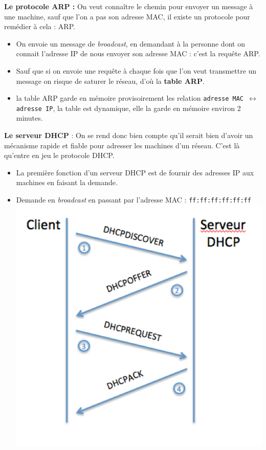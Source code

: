 \documentclass[a4paper,9pt, twocolumn]{article}
\begin{document}
	\textbf{Le protocole ARP :} On veut connaître le chemin pour envoyer un message à une machine, sauf que l'on a pas son adresse MAC, il existe un protocole pour remédier à cela : ARP.
	\begin{itemize}
		\item On envoie un message de \emph{broadcast}, en demandant à la personne dont on connait l'adresse IP de nous envoyer son adresse MAC : c'est la requête ARP.
		\item Sauf que si on envoie une requête à chaque fois que l'on veut transmettre un message on risque de saturer le réseau, d'où la \textbf{table ARP}.
		\item la table ARP garde en mémoire provisoirement les relation \texttt{adresse MAC $\leftrightarrow$ adresse IP}, la table est dynamique, elle la garde en mémoire environ 2 minutes.
		\end{itemize}
		\textbf{Le serveur DHCP} : On se rend donc bien compte qu'il serait bien d'avoir un mécanisme rapide et fiable pour adresser les machines d'un réseau. C'est là qu'entre en jeu le protocole DHCP.
		\begin{itemize}
		\item La première fonction d'un serveur DHCP est de fournir des adresses IP  aux machines en faisant la demande.
		\item Demande en \emph{broadcast} en passant par l'adresse MAC : \texttt{ff:ff:ff:ff:ff:ff}
			\includegraphics[scale=0.4]{dhcp.png}
	\end{itemize}
	
\end{document}

